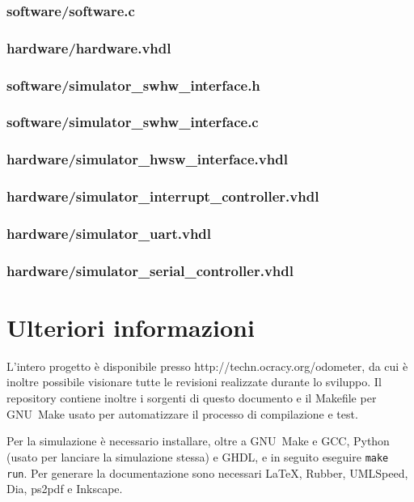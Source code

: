 \documentclass [11pt,a4paper,oneside]{paper}
\newcommand{\href}[2]{#2}
\newcommand{\link}[1]{\href{#1}{#1}}
\newcommand{\inputVHDL}[1]{}
\newcommand{\inputC}[1]{}
\begin{document}
\subsubsection{software/software.c}
\inputC{software/software.c}

\subsubsection{hardware/hardware.vhdl}
\inputVHDL{hardware/hardware.vhdl}

\subsubsection{software/simulator\_swhw\_interface.h}
\inputC{software/simulator_swhw_interface.h}

\subsubsection{software/simulator\_swhw\_interface.c}
\inputC{software/simulator_swhw_interface.c}

\subsubsection{hardware/simulator\_hwsw\_interface.vhdl}
\inputVHDL{hardware/simulator_hwsw_interface.vhdl}

\subsubsection{hardware/simulator\_interrupt\_controller.vhdl}
\inputVHDL{hardware/simulator_interrupt_controller.vhdl}

\subsubsection{hardware/simulator\_uart.vhdl}
\inputVHDL{hardware/simulator_uart.vhdl}

\subsubsection{hardware/simulator\_serial\_controller.vhdl}
\inputVHDL{hardware/simulator_serial_controller.vhdl}


\section{Ulteriori informazioni}
L'intero progetto è disponibile presso \link{http://techn.ocracy.org/odometer}, da cui
è inoltre possibile visionare tutte le revisioni realizzate durante lo sviluppo.
Il repository contiene inoltre i sorgenti di questo documento e il Makefile
per GNU~Make usato per automatizzare il processo di compilazione e test.

Per la simulazione è necessario installare, oltre a GNU~Make e GCC, Python
(usato per lanciare la simulazione stessa) e GHDL, e in seguito eseguire
\texttt{make run}. Per generare la documentazione sono necessari \LaTeX,
Rubber, UMLSpeed, Dia, ps2pdf e Inkscape.
\end{document}

